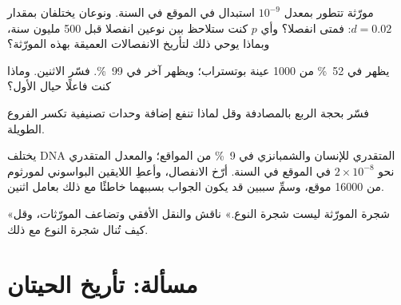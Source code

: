 \begin{exercise}[$\star\star$]\label{exo:b2:phylogenetic-trees:8}
مورّثة تتطور بمعدل $10^{-9}$ استبدال في الموقع في السنة. ونوعان
يختلفان بمقدار $d = 0.02$: فمتى انفصلا؟ وأي $p$ كنت
ستلاحظ بين نوعين انفصلا قبل 500 مليون سنة،
وبماذا يوحي ذلك لتأريخ الانفصالات العميقة بهذه المورّثة؟
\end{exercise}

\begin{exercise}[$\star\star$]\label{exo:b2:phylogenetic-trees:9}
يظهر  في \qty{52}{\%} من \num{1000} عينة بوتستراب؛
ويظهر آخر في \qty{99}{\%}. فسّر الاثنين. وماذا كنت فاعلًا حيال
الأول؟
\end{exercise}

\begin{exercise}[$\star\star\star$]\label{exo:b2:phylogenetic-trees:10}
فسّر  بحجة الربع بالمصادفة
وقل لماذا تنفع إضافة وحدات تصنيفية تكسر الفروع الطويلة.
\end{exercise}

\begin{exercise}[$\star\star\star$]\label{exo:b2:phylogenetic-trees:11}
يختلف DNA المتقدري للإنسان والشمبانزي في \qty{9}{\%} من
المواقع؛ والمعدل المتقدري نحو $2\times 10^{-8}$ في الموقع
في السنة. أرّخ الانفصال، وأعطِ اللايقين البواسوني لمورثوم من
\qty{16000}{} موقع، وسمِّ سببين قد يكون الجواب بسببهما
خاطئًا مع ذلك بعامل اثنين.
\end{exercise}

\begin{exercise}[$\star\star\star$]\label{exo:b2:phylogenetic-trees:12}
«شجرة المورّثة ليست شجرة النوع.» ناقش  والنقل الأفقي وتضاعف المورّثات، وقل
كيف تُنال شجرة النوع مع ذلك.
\end{exercise}

\section{مسألة: تأريخ الحيتان}

